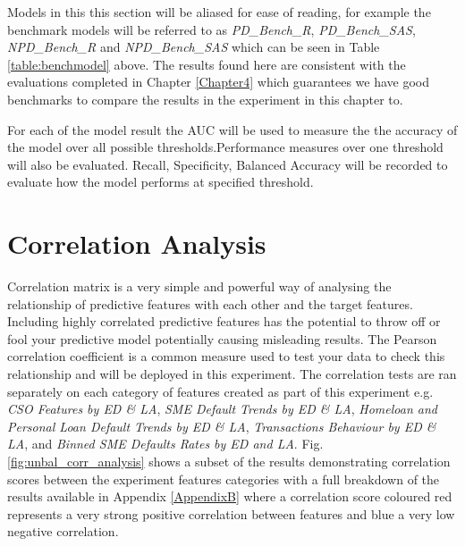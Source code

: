 Models in this this section will be aliased for ease of reading, for example the benchmark models will be referred to as \textit{PD\_Bench\_R}, \textit{PD\_Bench\_SAS}, \textit{NPD\_Bench\_R} and \textit{NPD\_Bench\_SAS} which can be seen in Table \ref{table:benchmodel} above. The results found here are consistent with the evaluations completed in Chapter \ref{Chapter4} which guarantees we have good benchmarks to compare the results in the experiment in this chapter to.


For each of the model result the AUC will be used to measure the the accuracy of the model over all possible thresholds.Performance measures over one threshold will also be evaluated. Recall, Specificity, Balanced Accuracy will be recorded to evaluate how the model performs at specified threshold.


\section{Correlation Analysis}
Correlation matrix is a very simple and powerful way of analysing the relationship of predictive features with each other and the target features. Including highly correlated predictive features has the potential to throw off or fool your predictive model potentially causing misleading results. The Pearson correlation coefficient is a common measure used to test your data to check this relationship and will be deployed in this experiment. The correlation tests are ran separately on each category of features created as part of this experiment e.g. \textit{CSO Features by ED \& LA}, \textit{SME Default Trends by ED \& LA}, \textit{Homeloan and Personal Loan Default Trends by ED \& LA}, \textit{Transactions Behaviour by ED \& LA}, and \textit{Binned SME Defaults Rates by ED and LA}. Fig. \ref{fig:unbal_corr_analysis} shows a subset of the results demonstrating correlation scores between the experiment features categories with a full breakdown of the results available in Appendix \ref{AppendixB} where a correlation score coloured red represents a very strong positive correlation between features and blue a very low negative correlation.


